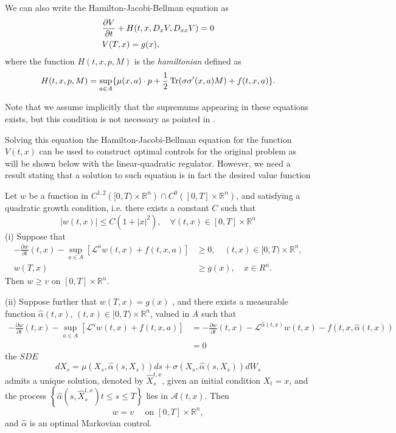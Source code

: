 We can also write the Hamilton-Jacobi-Bellman equation as 
\begin{equation}
		\begin{split}
		&\frac{\partial V}{\partial t}+H(t,x,D_x V,D_{xx} V)=0\\
		&V(T,x)=g(x),
	\end{split}
\end{equation}
where the function $H(t,x,p,M)$ is the \textit{hamiltonian} defined as
\begin{equation}
	H(t,x,p,M)=\sup_{a\in A}\{\mu(x,a)\cdot p+\frac{1}{2}\operatorname{Tr} (\sigma\sigma'(x,a)M)+f(t,x,a)\}.
\end{equation}

Note that we assume implicitly that the supremums appearing in these equations exists, but this condition is not necessary as pointed in \cite{pham_continuous-time_2009}.

Solving this equation the Hamilton-Jacobi-Bellman equation for the function $V(t,x)$ can be used to construct optimal controls for the original problem as will be shown below with the linear-quadratic regulator. However, we need a result stating that a solution to such equation is in fact the desired value function
\begin{thm}
	Let $w$ be a function in $C^{1,2}\left([0, T) \times \mathbb{R}^n\right) \cap C^0\left([0, T] \times \mathbb{R}^n\right)$, and satisfying a quadratic growth condition, i.e. there exists a constant $C$ such that
	$$
	|w(t, x)| \leq C\left(1+|x|^2\right), \quad \forall(t, x) \in[0, T] \times \mathbb{R}^n
	$$
	(i) Suppose that
	$$
	\begin{aligned}
		-\frac{\partial w}{\partial t}(t, x)-\sup _{a \in A}\left[\mathcal{L}^a w(t, x)+f(t, x, a)\right] & \geq 0, \quad(t, x) \in[0, T) \times \mathbb{R}^n, \\
		w(T, x) & \geq g(x), \quad x \in R^n .
	\end{aligned}
	$$
	Then $w \geq v$ on $[0, T] \times \mathbb{R}^n$.
	
	(ii) Suppose further that $w(T,x)=g(x)$ , and there exists a measurable function $\hat{\alpha}(t, x)$, $(t, x) \in[0, T) \times \mathbb{R}^n$, valued in $A$ such that
	$$
	\begin{aligned}
		-\frac{\partial w}{\partial t}(t, x)-\sup _{a \in A}\left[\mathcal{L}^a w(t, x)+f(t, x, a)\right] & =-\frac{\partial w}{\partial t}(t, x)-\mathcal{L}^{\hat{\alpha}(t, x)} w(t, x)-f(t, x, \hat{\alpha}(t, x)) \\
		& =0
	\end{aligned}
	$$
	the $S D E$
	$$
	d X_s=\mu\left(X_s, \hat{\alpha}\left(s, X_s\right)\right) d s+\sigma\left(X_s, \hat{\alpha}\left(s, X_s\right)\right) d W_s
	$$
	admits a unique solution, denoted by $\hat{X}_s^{t, x}$, given an initial condition $X_t=x$, and the process $\left\{\hat{\alpha}\left(s, \hat{X}_s^{t, x}\right) t \leq s \leq T\right\}$ lies in $\mathcal{A}(t, x)$. Then
	$$
	w=v \quad \text { on }[0, T] \times \mathbb{R}^n,
	$$
	and $\hat{\alpha}$ is an optimal Markovian control.
\end{thm}
